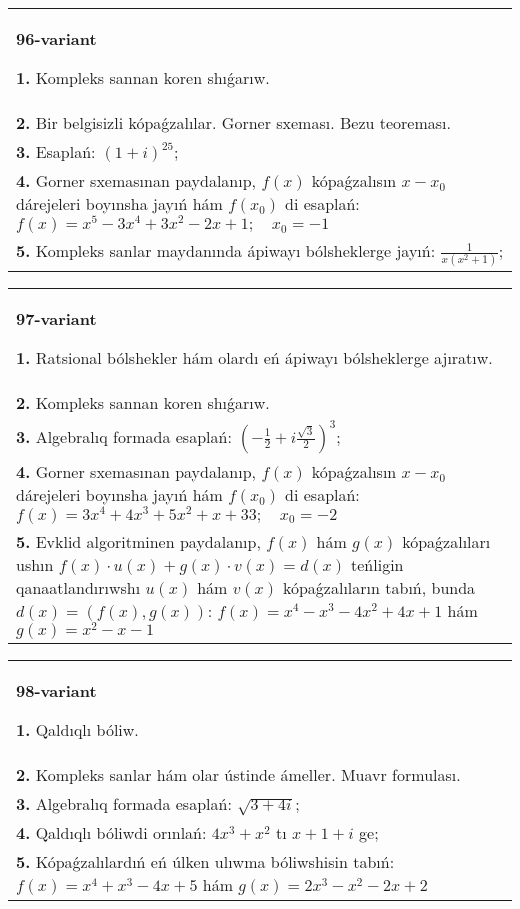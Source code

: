 \documentclass{article}
\begin{document}
\begin{tabular}{m{17cm}}
\textbf{96-variant}
\newline

\textbf{1.} Kompleks sannan koren shıǵarıw. \\
\textbf{2.} Bir belgisizli kópaǵzalılar. Gorner sxeması. Bezu teoreması.  \\
\textbf{3.} Esaplań:  $(1+i)^{25}$; \\
\textbf{4.} Gorner sxemasınan paydalanıp, $f(x)$ kópaǵzalısın $x-x_0$ dárejeleri boyınsha jayıń hám $f\left(x_0\right)$ di esaplań: $f(x)=x^5-3 x^4+3 x^2-2 x+1 ; \quad x_0=-1$ \\
\textbf{5.} Kompleks sanlar maydanında ápiwayı bólsheklerge jayıń: $\frac{1}{x\left(x^2+1\right)}$; \\

\end{tabular}
\vspace{1cm}


\begin{tabular}{m{17cm}}
\textbf{97-variant}
\newline

\textbf{1.} Ratsional bólshekler hám olardı eń ápiwayı bólsheklerge ajıratıw. \\
\textbf{2.} Kompleks sannan koren shıǵarıw. \\
\textbf{3.} Algebralıq formada esaplań:  $\left(-\frac{1}{2}+i \frac{\sqrt{3}}{2}\right)^3$; \\
\textbf{4.} Gorner sxemasınan paydalanıp, $f(x)$ kópaǵzalısın $x-x_0$ dárejeleri boyınsha jayıń hám $f\left(x_0\right)$ di esaplań: $f(x)=3 x^4+4 x^3+5 x^2+x+33 ; \quad x_0=-2$ \\
\textbf{5.} Evklid algoritminen paydalanıp, $f(x)$ hám $g(x)$ kópaǵzalıları ushın $f(x) \cdot u(x)+g(x) \cdot v(x)=d(x)$ teńligin qanaatlandırıwshı $u(x)$ hám $v(x)$ kópaǵzalıların tabıń, bunda $d(x)=(f(x), g(x))$:  $f(x)=x^4-x^3-4 x^2+4 x+1$ hám $g(x)=x^2-x-1$ \\

\end{tabular}
\vspace{1cm}


\begin{tabular}{m{17cm}}
\textbf{98-variant}
\newline

\textbf{1.} Qaldıqlı bóliw.  \\
\textbf{2.} Kompleks sanlar hám olar ústinde ámeller. Muavr formulası.  \\
\textbf{3.} Algebralıq formada esaplań:  $\sqrt{3+4 i}$; \\
\textbf{4.} Qaldıqlı bóliwdi orınlań: $4 x^3+x^2$ tı $x+1+i$ ge; \\
\textbf{5.} Kópaǵzalılardıń eń úlken ulıwma bóliwshisin tabıń:  $f(x)=x^4+x^3-4 x+5$ hám $g(x)=2 x^3-x^2-2 x+2$ \\

\end{tabular}
\vspace{1cm}
\end{document}
